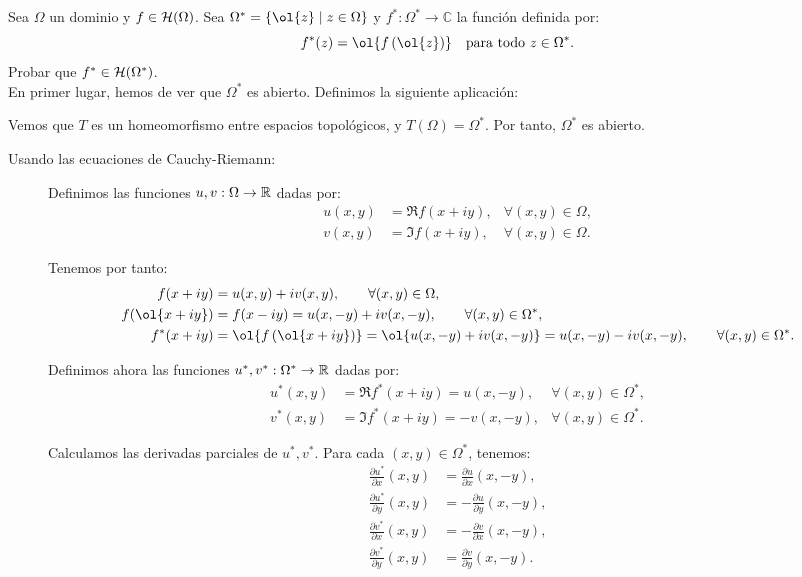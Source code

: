 \begin{ejercicio}\label{ej:3.6}
    Sea $\Omega$ un dominio y $f \in \mathcal{H}(\Omega)$. Sea $\Omega^* = \{\ol{z} \mid z \in \Omega\}$ y $f^* : \Omega^* \to \mathbb{C}$ la función definida por:
    \[
        f^*(z) = \ol{f\left(\ol{z}\right)} \quad \text{para todo } z \in \Omega^*.
    \]
    Probar que $f^* \in \mathcal{H}(\Omega^*)$.\\

    En primer lugar, hemos de ver que $\Omega^*$ es abierto. Definimos la siguiente aplicación:

    Vemos que $T$ es un homeomorfismo entre espacios topológicos, y $T(\Omega)=\Omega^*$. Por tanto, $\Omega^*$ es abierto.
    \begin{description}
        \item[Usando las ecuaciones de Cauchy-Riemann:]
        
        Definimos las funciones $u,v:\Omega\to\mathbb{R}$ dadas por:
        \begin{align*}
            u(x,y) &= \Re f(x+iy),&\forall (x,y)\in\Omega,\\
            v(x,y) &= \Im f(x+iy),&\forall (x,y)\in\Omega.
        \end{align*}

        Tenemos por tanto:
        \begin{align*}
            f(x+iy) &= u(x,y) + iv(x,y),\qquad \forall (x,y)\in\Omega,\\
            f(\ol{x+iy}) &= f(x-iy) = u(x,-y) + iv(x,-y),\qquad \forall (x,y)\in\Omega^*,\\
            f^*(x+iy) &= \ol{f\left(\ol{x+iy}\right)} = \ol{u(x,-y) + iv(x,-y)} = u(x,-y) - iv(x,-y),\qquad \forall (x,y)\in\Omega^*.
        \end{align*}

        Definimos ahora las funciones $u^*,v^*:\Omega^*\to\mathbb{R}$ dadas por:
        \begin{align*}
            u^*(x,y) &= \Re f^*(x+iy)=u(x,-y),&\forall (x,y)\in\Omega^*,\\
            v^*(x,y) &= \Im f^*(x+iy)=-v(x,-y),&\forall (x,y)\in\Omega^*.
        \end{align*}

        Calculamos las derivadas parciales de $u^*,v^*$. Para cada $(x,y)\in\Omega^*$, tenemos:
        \begin{align*}
            \frac{\partial u^*}{\partial x}(x,y) &= \frac{\partial u}{\partial x}(x,-y),\\
            \frac{\partial u^*}{\partial y}(x,y) &= -\frac{\partial u}{\partial y}(x,-y),\\
            \frac{\partial v^*}{\partial x}(x,y) &= -\frac{\partial v}{\partial x}(x,-y),\\
            \frac{\partial v^*}{\partial y}(x,y) &= \frac{\partial v}{\partial y}(x,-y).
        \end{align*}


\end{description}
\end{ejercicio}
